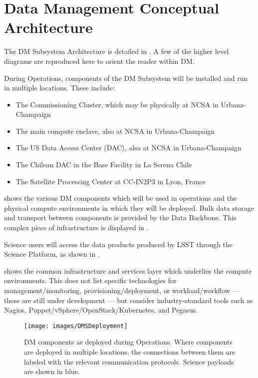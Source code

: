 \section{Data Management Conceptual Architecture \label{sect:dmarc}}

The DM Subsystem Architecture is detailed in .
A few of the higher level diagrams are reproduced here to orient the reader within DM.

During Operations, components of the DM Subsystem will be installed and run in
multiple locations. These include:

\begin{itemize}
\item The Commissioning Cluster, which may be physically at NCSA in Urbana-Champaign
\item The main compute enclave, also at NCSA in Urbana-Champaign
\item The US Data Access Center (DAC), also at NCSA in Urbana-Champaign
\item The Chilean DAC in the Base Facility in La Serena Chile
\item The Satellite Processing Center at CC-IN2P3 in Lyon, France
\end{itemize}

 shows the various DM components which will be used in operations and the physical compute environments in which they will be deployed.
Bulk data storage and transport between components is provided by the Data Backbone. This complex piece of infrastructure is displayed in .

Science users will access the data products produced by LSST through the
Science Platform, as shown in .

 shows the common infrastructure and services layer which underlies the compute environments.
This does not list specific technologies for management/monitoring, provisioning/deployment, or workload/workflow --- these are still under development --- but consider industry-standard tools such as Nagios, Puppet/vSphere/OpenStack/Kubernetes, and Pegasus.

\begin{figure}[htbp]
\begin{center}
\texttt{[image: images/DMSDeployment]}
\caption{DM components as deployed during Operations. Where components are
deployed in multiple locations, the connections between them are labeled with
the relevant communication protocols. Science payloads are shown in blue.
\label{fig:dmsdeploy}}
\end{center}
\end{figure}

